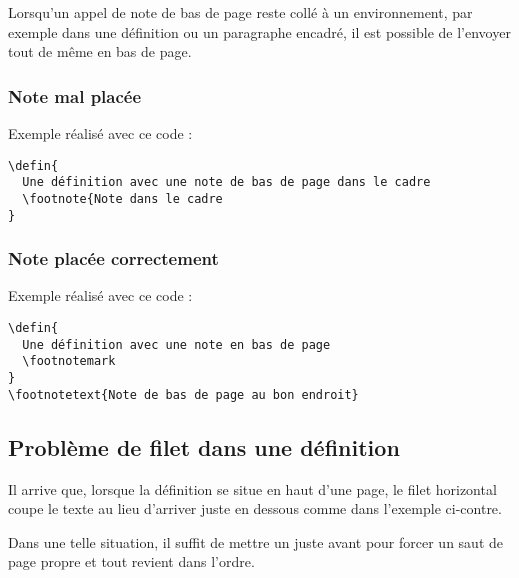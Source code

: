 Lorsqu'un appel de note de bas de page reste collé à un environnement, par exemple dans une définition ou un paragraphe encadré, il est possible de l'envoyer tout de même en bas de page.

\subsubsection{Note mal placée}


Exemple réalisé avec ce code :

\begin{verbatim}
\defin{
  Une définition avec une note de bas de page dans le cadre
  \footnote{Note dans le cadre
}
\end{verbatim}

\subsubsection{Note placée correctement}

Exemple réalisé avec ce code :

\begin{verbatim}
\defin{
  Une définition avec une note en bas de page
  \footnotemark
}
\footnotetext{Note de bas de page au bon endroit}
\end{verbatim}



\subsection{Problème de filet dans une définition}

\begin{minipage}[t]{.5\linewidth}
	Il arrive que, lorsque la définition se situe en haut d'une page, le filet horizontal coupe le texte au lieu d'arriver juste en dessous comme dans l'exemple ci-contre.
	
	Dans une telle situation, il suffit de mettre un \inlatex{\newpage} juste avant pour forcer un saut de page propre et tout revient dans l'ordre.
\end{minipage}
\hfill
\begin{minipage}[t]{.45\linewidth}
	\vspace{-5ex}
\end{minipage}



